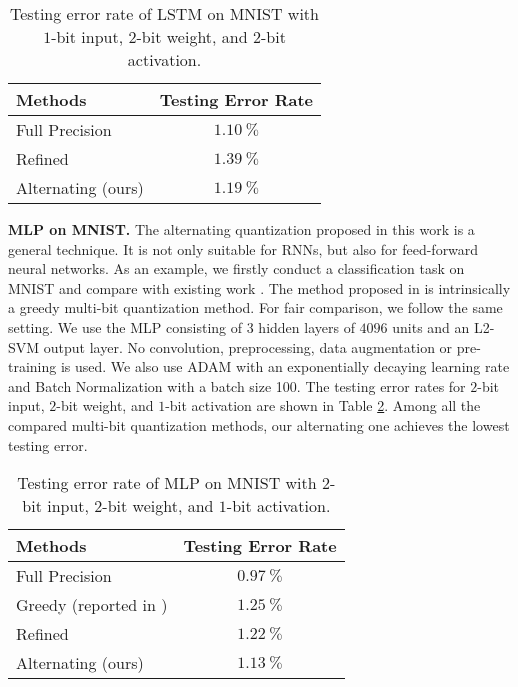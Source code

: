 \documentclass{article} %
\newcommand{\<}{\left\langle}
\renewcommand{\>}{\right\rangle}
\begin{document}
\begin{table}[!t]
	\caption{Testing error rate of LSTM on MNIST with $1$-bit input, $2$-bit weight, and $2$-bit activation.}
	\renewcommand{\arraystretch}{1.3}
	\label{sequentialmnist}
	\begin{center}
		\begin{tabular}{l c}
			\toprule[1.5pt]
			Methods &Testing Error Rate \\
			\hline
			Full Precision            &   $1.10~\%$ \\
			\hline
			Refined \citep{refinedgreedy} \qquad\qquad\qquad  & $1.39~\%$ \\
			Alternating (ours)        &    $\mathbf{1.19}~\%$ \\
			\hline
		\end{tabular}
	\end{center}
\end{table}




\textbf{MLP on MNIST.} The alternating quantization proposed in this work is a general technique. It is not only suitable for RNNs, but also for feed-forward neural networks. As an example,  we firstly conduct a classification task on MNIST and compare with existing work \citep{greedy2}. The method proposed in \citep{greedy2} is intrinsically a greedy multi-bit quantization method. For fair comparison, we follow the same setting. We use the MLP consisting of $3$ hidden layers of $4096$ units and an L2-SVM output layer. No convolution, preprocessing, data augmentation or pre-training is used. We also use ADAM \citep{adam} with an exponentially decaying learning rate and Batch Normalization \citep{bn} with a batch size 100. The testing error rates for $2$-bit input, $2$-bit weight, and $1$-bit activation are shown in Table \ref{mnist}. Among all the compared multi-bit quantization methods, our alternating one achieves the lowest testing error.

\begin{table}[!t]
	\caption{Testing error rate of MLP on MNIST with $2$-bit input, $2$-bit weight, and $1$-bit activation.}
	\renewcommand{\arraystretch}{1.3}
	\label{mnist}
	\begin{center}
		\begin{tabular}{l c}
			\toprule[1.5pt]
			Methods & Testing Error Rate \\
			\hline
			Full Precision                                &$0.97~\%$ \\ \hline
			Greedy (reported in \citep{greedy2})           &  $1.25~\%$\\	
			Refined \citep{refinedgreedy} \qquad\qquad\qquad  & $1.22~\%$  \\
			Alternating (ours)        &    $\mathbf{1.13}~\%$ \\ \hline			
		\end{tabular}
	\end{center}
\end{table}
\end{document}
